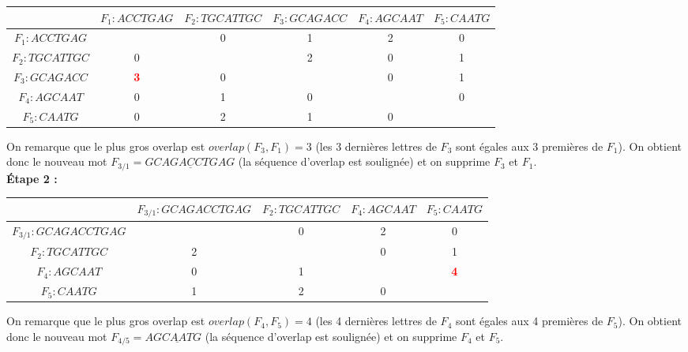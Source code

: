 \documentclass[11pt,letterpaper]{article}
\begin{document}
\begin{center}
\begin{tabular}{|*{6}{c|}}
    \hline
    & $F_1 : ACCTGAG$ & $F_2 : TGCATTGC$ & $F_3 : GCAGACC$ & $F_4 : AGCAAT$ & $F_5 : CAATG$\\
    \hline
    $F_1 : ACCTGAG$ & & 0 & 1 & 2 & 0\\
    \hline
    $F_2 : TGCATTGC$  & 0 & & 2 & 0 & 1 \\
    \hline
    $F_3 : GCAGACC$  & \textbf{\textcolor{red}{3}} & 0 & & 0 & 1\\
    \hline
    $F_4 : AGCAAT$  & 0 & 1 & 0 & & 0 \\
    \hline
    $F_5 : CAATG$  & 0 & 2 & 1 & 0 & \\
    \hline
\end{tabular}
\end{center}

\vspace{3px}

On remarque que le plus gros overlap est $overlap(F_3,F_1) = 3$ (les 3 dernières lettres de $F_3$ sont égales aux 3 premières de $F_1$). On obtient donc le nouveau mot $F_{3/1} = GCAG\underline{ACC}TGAG$ (la séquence d'overlap est soulignée) et on supprime $F_3$ et $F_1$.\\

\textbf{Étape 2 :}\\

\begin{center}
\begin{tabular}{|*{5}{c|}}
    \hline
    & $F_{3/1} : GCAGACCTGAG$  & $F_2 : TGCATTGC$ & $F_4 : AGCAAT$ & $F_5 : CAATG$\\
    \hline
    $F_{3/1} : GCAGACCTGAG$ & & 0 & 2 & 0\\
    \hline
    $F_2 : TGCATTGC$ & 2 & & 0 & 1\\
    \hline
    $F_4 : AGCAAT$ & 0 & 1 & & \textbf{\textcolor{red}{4}}\\
    \hline
    $F_5 : CAATG$ & 1 & 2 & 0 &\\
    \hline
\end{tabular}
\end{center}

\vspace{5px}

On remarque que le plus gros overlap est $overlap(F_4,F_5) = 4$ (les 4 dernières lettres de $F_4$ sont égales aux 4 premières de $F_5$). On obtient donc le nouveau mot $F_{4/5} = AG\underline{CAAT}G$ (la séquence d'overlap est soulignée) et on supprime $F_4$ et $F_5$.\\
\end{document}
